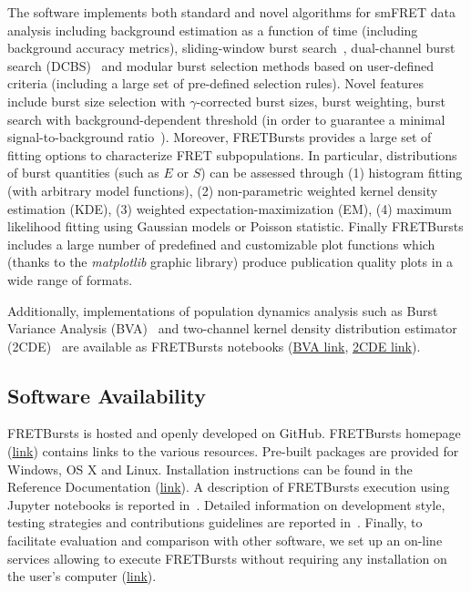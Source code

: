 \documentclass[10pt,letterpaper]{article}
\begin{document}
The software implements both standard and novel algorithms for smFRET data analysis
including background estimation as a function of time (including background accuracy
metrics), sliding-window burst search~\cite{Eggeling_1998},
dual-channel burst search (DCBS)~\cite{Nir_2006} and
modular burst selection methods based on user-defined criteria
(including a large set of pre-defined selection rules). Novel features include burst size
selection with $\gamma$-corrected burst sizes, burst weighting, burst search with
background-dependent threshold (in order to guarantee a minimal signal-to-background
ratio~\cite{Michalet_2012}).
Moreover, FRETBursts provides a large set of fitting options to characterize FRET subpopulations.
In particular, distributions of burst quantities (such as $E$ or $S$) can be assessed
through (1) histogram fitting (with arbitrary model functions),
(2) non-parametric weighted kernel density estimation (KDE), (3) weighted
expectation-maximization (EM), (4) maximum likelihood fitting using Gaussian models
or Poisson statistic. Finally FRETBursts includes a large number of
predefined and customizable plot functions which (thanks to the \textit{matplotlib}
graphic library) produce publication quality plots in a wide range of formats.

Additionally, implementations of population dynamics analysis such
as Burst Variance Analysis (BVA)~\cite{Torella_2011} and two-channel
kernel density distribution estimator (2CDE)~\cite{Tomov_2012}
are available as FRETBursts notebooks
(\href{http://nbviewer.jupyter.org/github/tritemio/FRETBursts_notebooks/blob/master/notebooks/Example%20-%20Burst%20Variance%20Analysis.ipynb}{BVA link},
\href{http://nbviewer.jupyter.org/github/tritemio/FRETBursts_notebooks/blob/master/notebooks/Example%20-%202CDE%20Method.ipynb}{2CDE link}).

\subsection*{Software Availability}
FRETBursts is hosted and openly developed on GitHub. FRETBursts homepage
(\href{http://tritemio.github.io/FRETBursts}{link})
contains links to the various resources. Pre-built packages are provided for
Windows, OS X and Linux. Installation instructions
can be found in the Reference Documentation
(\href{http://fretbursts.readthedocs.org/en/latest/getting_started.html}{link}).
A description of FRETBursts execution using Jupyter notebooks is reported
in~. %
Detailed information on development style, testing strategies and
contributions guidelines are reported in~. %
Finally, to facilitate evaluation and comparison with other software,
we set up an on-line services allowing to execute FRETBursts
without requiring any installation on the user's computer (\href{https://github.com/tritemio/FRETBursts_notebooks#run-online}{link}).
\end{document}
